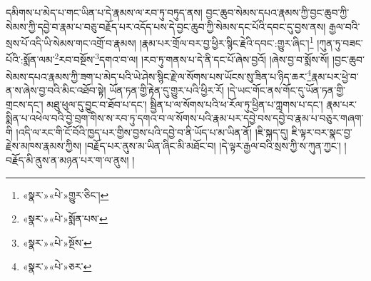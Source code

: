 དམིགས་པ་མེད་པ་གང་ཡིན་པ་དེ་རྣམས་ལ་རབ་ཏུ་བཏུད་ནས། བྱང་ཆུབ་སེམས་དཔའ་རྣམས་ཀྱི་བྱང་ཆུབ་ཀྱི་སེམས་ཀྱི་དབྱེ་བ་རྣམ་པ་བཅུ་བརྗོད་པར་འདོད་པས་དེ་བྱང་ཆུབ་ཀྱི་སེམས་དང་པོའི་དབང་དུ་བྱས་ནས། རྒྱལ་བའི་སྲས་པོ་འདི་ཡི་སེམས་གང་འགྲོ་བ་རྣམས། །རྣམ་པར་གྲོལ་བར་བྱ་ཕྱིར་སྙིང་རྗེའི་དབང་:གྱུར་ཞིང་།\footnote{«སྣར་»«པེ་»གྱུར་ཅིང་།} །ཀུན་ཏུ་བཟང་པོའི་:སྨོན་ལམ་\footnote{«སྣར་»«པེ་»སྨོན་པས་}རབ་བསྔོས་\footnote{«སྣར་»«པེ་»སྔོས་}དགའ་བ་ལ། །རབ་ཏུ་གནས་པ་དེ་ནི་དང་པོ་ཞེས་བྱའོ། །ཞེས་བྱ་བ་སྨོས་སོ། །བྱང་ཆུབ་སེམས་དཔའ་རྣམས་ཀྱི་ཟག་པ་མེད་པའི་ཡེ་ཤེས་སྙིང་རྗེ་ལ་སོགས་པས་ཡོངས་སུ་ཟིན་པ་ཉིད་ཆར་\footnote{«སྣར་»«པེ་»ཅར་}རྣམ་པར་ཕྱེ་བ་ན་ས་ཞེས་བྱ་བའི་མིང་འཐོབ་སྟེ། ཡོན་ཏན་གྱི་རྟེན་དུ་གྱུར་པའི་ཕྱིར་རོ། །དེ་ཡང་གོང་ནས་གོང་དུ་ཡོན་ཏན་གྱི་གྲངས་དང་། མཐུ་ཕུལ་དུ་བྱུང་བ་ཐོབ་པ་དང་། སྦྱིན་པ་ལ་སོགས་པའི་ཕ་རོལ་ཏུ་ཕྱིན་པ་ཀླགས་པ་དང་། རྣམ་པར་སྨིན་པ་འཕེལ་བའི་བྱེ་བྲག་གིས་ས་རབ་ཏུ་དགའ་བ་ལ་སོགས་པའི་རྣམ་པར་དབྱེ་བས་དབྱེ་བ་རྣམ་པ་བཅུར་གཞག་གི །འདི་ལ་རང་གི་ངོ་བོའི་ཁྱད་པར་གྱིས་བྱས་པའི་དབྱེ་བ་ནི་ཡོད་པ་མ་ཡིན་ནོ། །ཇི་སྐད་དུ། ཇི་ལྟར་བར་སྣང་བྱ་རྗེས་མཁས་རྣམས་ཀྱིས། །བརྗོད་པར་ནུས་མ་ཡིན་ཞིང་མི་མཐོང་བ། །དེ་ལྟར་རྒྱལ་བའི་སྲས་ཀྱི་ས་ཀུན་ཀྱང་། །བརྗོད་མི་ནུས་ན་མཉན་པར་ག་ལ་ནུས། །
